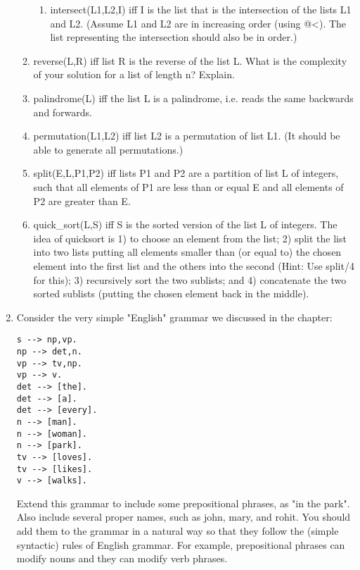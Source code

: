 \begin{enumerate}
\begin{enumerate}
\begin{enumerate}
\item
intersect(L1,L2,I) iff I is the list that is the intersection of
the lists L1 and L2. (Assume L1 and L2 are in increasing order (using
@<).  The list representing the intersection should also be in order.)
\end{enumerate}

\item
reverse(L,R) iff list R is the reverse of the list L.  What is
the complexity of your solution for a list of length n?  Explain.

\item
palindrome(L) iff the list L is a palindrome, i.e. reads the same
backwards and forwards.

\item
permutation(L1,L2) iff list L2 is a permutation of list L1. (It
should be able to generate all permutations.)

\item
split(E,L,P1,P2) iff lists P1 and P2 are a partition of list L of
integers, such that all elements of P1 are less than or equal E and
all elements of P2 are greater than E.

\item
quick\_sort(L,S) iff S is the sorted version of the list L of
integers. The idea of quicksort is 1) to choose an element from the
list; 2) split the list into two lists putting all elements smaller
than (or equal to) the chosen element into the first list and the
others into the second (Hint: Use split/4 for this); 3) recursively
sort the two sublists; and 4) concatenate the two sorted sublists
(putting the chosen element back in the middle).
\end{enumerate}

\item
Consider the very simple "English" grammar we discussed in the chapter:

\begin{verbatim}
s --> np,vp.
np --> det,n.
vp --> tv,np.
vp --> v.
det --> [the].
det --> [a].
det --> [every].
n --> [man].
n --> [woman].
n --> [park].
tv --> [loves].
tv --> [likes].
v --> [walks].
\end{verbatim}

Extend this grammar to include some prepositional phrases, as "in the
park".  Also include several proper names, such as john, mary, and
rohit.  You should add them to the grammar in a natural way so that
they follow the (simple syntactic) rules of English grammar.  For
example, prepositional phrases can modify nouns and they can modify
verb phrases.


\end{enumerate}
